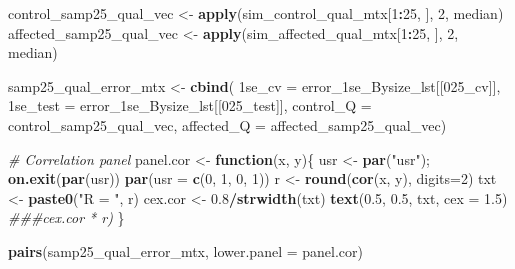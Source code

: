 \documentclass[
]{book}
\newenvironment{Shaded}{\begin{snugshade}}{\end{snugshade}}
\newcommand{\CommentTok}[1]{\textcolor[rgb]{0.56,0.35,0.01}{\textit{#1}}}
\newcommand{\ControlFlowTok}[1]{\textcolor[rgb]{0.13,0.29,0.53}{\textbf{#1}}}
\newcommand{\DataTypeTok}[1]{\textcolor[rgb]{0.13,0.29,0.53}{#1}}
\newcommand{\DecValTok}[1]{\textcolor[rgb]{0.00,0.00,0.81}{#1}}
\newcommand{\FloatTok}[1]{\textcolor[rgb]{0.00,0.00,0.81}{#1}}
\newcommand{\KeywordTok}[1]{\textcolor[rgb]{0.13,0.29,0.53}{\textbf{#1}}}
\newcommand{\NormalTok}[1]{#1}
\newcommand{\OperatorTok}[1]{\textcolor[rgb]{0.81,0.36,0.00}{\textbf{#1}}}
\newcommand{\StringTok}[1]{\textcolor[rgb]{0.31,0.60,0.02}{#1}}
\begin{document}
\begin{Shaded}
\begin{Highlighting}[]
\NormalTok{control\_samp25\_qual\_vec <{-}}\StringTok{ }\KeywordTok{apply}\NormalTok{(sim\_control\_qual\_mtx[}\DecValTok{1}\OperatorTok{:}\DecValTok{25}\NormalTok{, ], }\DecValTok{2}\NormalTok{, median)}
\NormalTok{affected\_samp25\_qual\_vec <{-}}\StringTok{ }\KeywordTok{apply}\NormalTok{(sim\_affected\_qual\_mtx[}\DecValTok{1}\OperatorTok{:}\DecValTok{25}\NormalTok{, ], }\DecValTok{2}\NormalTok{, median)}

\NormalTok{samp25\_qual\_error\_mtx <{-}}\StringTok{ }\KeywordTok{cbind}\NormalTok{(}
   \StringTok{\textasciigrave{}}\DataTypeTok{1se\_cv}\StringTok{\textasciigrave{}}\NormalTok{ =}\StringTok{ }\NormalTok{error\_1se\_Bysize\_lst[[}\StringTok{\textquotesingle{}025\_cv\textquotesingle{}}\NormalTok{]],}
   \StringTok{\textasciigrave{}}\DataTypeTok{1se\_test}\StringTok{\textasciigrave{}}\NormalTok{ =}\StringTok{ }\NormalTok{error\_1se\_Bysize\_lst[[}\StringTok{\textquotesingle{}025\_test\textquotesingle{}}\NormalTok{]],}
   \StringTok{\textasciigrave{}}\DataTypeTok{control\_Q}\StringTok{\textasciigrave{}}\NormalTok{ =}\StringTok{ }\NormalTok{control\_samp25\_qual\_vec,}
   \StringTok{\textasciigrave{}}\DataTypeTok{affected\_Q}\StringTok{\textasciigrave{}}\NormalTok{ =}\StringTok{ }\NormalTok{affected\_samp25\_qual\_vec)}
 

\CommentTok{\# Correlation panel}
\NormalTok{panel.cor <{-}}\StringTok{ }\ControlFlowTok{function}\NormalTok{(x, y)\{}
\NormalTok{    usr <{-}}\StringTok{ }\KeywordTok{par}\NormalTok{(}\StringTok{"usr"}\NormalTok{); }\KeywordTok{on.exit}\NormalTok{(}\KeywordTok{par}\NormalTok{(usr))}
    \KeywordTok{par}\NormalTok{(}\DataTypeTok{usr =} \KeywordTok{c}\NormalTok{(}\DecValTok{0}\NormalTok{, }\DecValTok{1}\NormalTok{, }\DecValTok{0}\NormalTok{, }\DecValTok{1}\NormalTok{))}
\NormalTok{    r <{-}}\StringTok{ }\KeywordTok{round}\NormalTok{(}\KeywordTok{cor}\NormalTok{(x, y), }\DataTypeTok{digits=}\DecValTok{2}\NormalTok{)}
\NormalTok{    txt <{-}}\StringTok{ }\KeywordTok{paste0}\NormalTok{(}\StringTok{"R = "}\NormalTok{, r)}
\NormalTok{    cex.cor <{-}}\StringTok{ }\FloatTok{0.8}\OperatorTok{/}\KeywordTok{strwidth}\NormalTok{(txt)}
    \KeywordTok{text}\NormalTok{(}\FloatTok{0.5}\NormalTok{, }\FloatTok{0.5}\NormalTok{, txt, }\DataTypeTok{cex =} \FloatTok{1.5}\NormalTok{) }\CommentTok{\#\#\#cex.cor * r)}
\NormalTok{\}}

\KeywordTok{pairs}\NormalTok{(samp25\_qual\_error\_mtx,}
 \DataTypeTok{lower.panel =}\NormalTok{ panel.cor)}
\end{Highlighting}
\end{Shaded}
\end{document}
